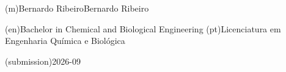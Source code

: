 %
%
\ntauthorname(m){Bernardo Ribeiro}{Bernardo Ribeiro}



%
%
%
\ntauthordegree(en){Bachelor in Chemical and Biological Engineering}
\ntauthordegree(pt){Licenciatura em Engenharia Química e Biológica}



%
%
%

%
%
\ntdate(submission){2026-09}       %



